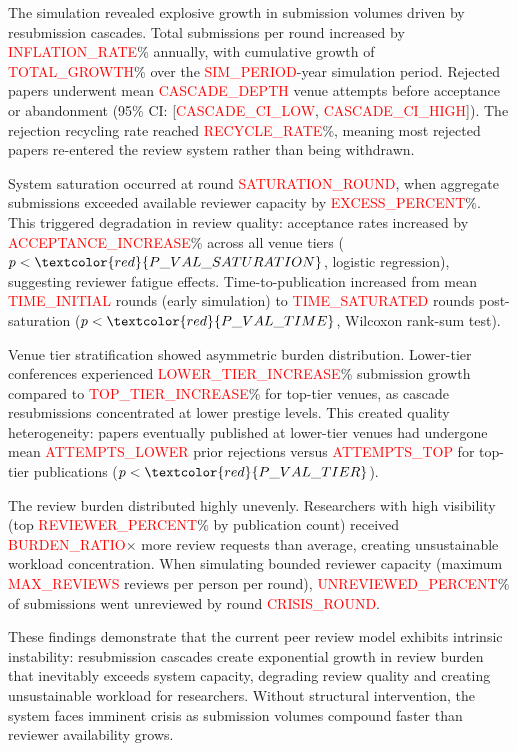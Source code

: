 \documentclass{article}
\begin{document}
The simulation revealed explosive growth in submission volumes driven by resubmission cascades. Total submissions per round increased by \textcolor{red}{INFLATION\_RATE}\% annually, with cumulative growth of \textcolor{red}{TOTAL\_GROWTH}\% over the \textcolor{red}{SIM\_PERIOD}-year simulation period. Rejected papers underwent mean \textcolor{red}{CASCADE\_DEPTH} venue attempts before acceptance or abandonment (95\% CI: [\textcolor{red}{CASCADE\_CI\_LOW}, \textcolor{red}{CASCADE\_CI\_HIGH}]). The rejection recycling rate reached \textcolor{red}{RECYCLE\_RATE}\%, meaning most rejected papers re-entered the review system rather than being withdrawn.

System saturation occurred at round \textcolor{red}{SATURATION\_ROUND}, when aggregate submissions exceeded available reviewer capacity by \textcolor{red}{EXCESS\_PERCENT}\%. This triggered degradation in review quality: acceptance rates increased by \textcolor{red}{ACCEPTANCE\_INCREASE}\% across all venue tiers ($p < \textcolor{red}{P\_VAL\_SATURATION}$, logistic regression), suggesting reviewer fatigue effects. Time-to-publication increased from mean \textcolor{red}{TIME\_INITIAL} rounds (early simulation) to \textcolor{red}{TIME\_SATURATED} rounds post-saturation ($p < \textcolor{red}{P\_VAL\_TIME}$, Wilcoxon rank-sum test).

Venue tier stratification showed asymmetric burden distribution. Lower-tier conferences experienced \textcolor{red}{LOWER\_TIER\_INCREASE}\% submission growth compared to \textcolor{red}{TOP\_TIER\_INCREASE}\% for top-tier venues, as cascade resubmissions concentrated at lower prestige levels. This created quality heterogeneity: papers eventually published at lower-tier venues had undergone mean \textcolor{red}{ATTEMPTS\_LOWER} prior rejections versus \textcolor{red}{ATTEMPTS\_TOP} for top-tier publications ($p < \textcolor{red}{P\_VAL\_TIER}$).

The review burden distributed highly unevenly. Researchers with high visibility (top \textcolor{red}{REVIEWER\_PERCENT}\% by publication count) received \textcolor{red}{BURDEN\_RATIO}$\times$ more review requests than average, creating unsustainable workload concentration. When simulating bounded reviewer capacity (maximum \textcolor{red}{MAX\_REVIEWS} reviews per person per round), \textcolor{red}{UNREVIEWED\_PERCENT}\% of submissions went unreviewed by round \textcolor{red}{CRISIS\_ROUND}.

These findings demonstrate that the current peer review model exhibits intrinsic instability: resubmission cascades create exponential growth in review burden that inevitably exceeds system capacity, degrading review quality and creating unsustainable workload for researchers. Without structural intervention, the system faces imminent crisis as submission volumes compound faster than reviewer availability grows.
\end{document}
